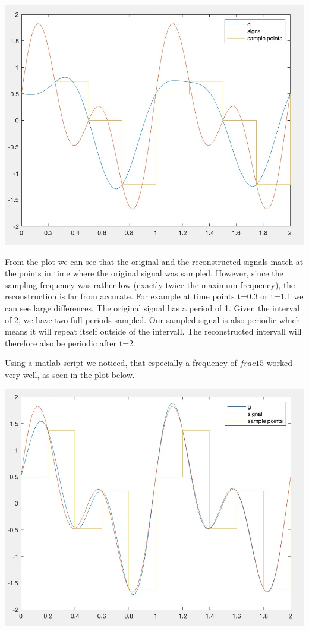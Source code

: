 \documentclass[12pt]{article}
\begin{document}
\begin{enumerate}[a)]
\begin{centering}
\includegraphics[scale = 0.3]{figures/sinc4}\\
\end{centering}

From the plot we can see that the original and the reconstructed signals match at the points in time where the original signal was sampled. However, since the sampling frequency was rather low (exactly twice the maximum frequency), the reconstruction is far from accurate. For example at time points t=0.3 or t=1.1 we can see large differences. The original signal has a period of 1. Given the interval of 2, we have two full  periods sampled. Our sampled signal is also periodic which means it will repeat itself outside of the intervall. The reconstructed intervall will therefore also be periodic after t=2.

Using a matlab script we noticed, that especially a frequency of $frac{1}{5}$ worked very well, as seen in the plot below.\\

\begin{centering}
\includegraphics[scale = 0.3]{figures/sinc5}\\
\end{centering}



\end{enumerate}
\end{document}
